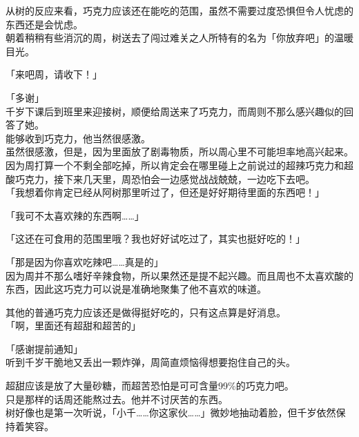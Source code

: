 从树的反应来看，巧克力应该还在能吃的范围，虽然不需要过度恐惧但令人忧虑的东西还是会忧虑。\\

朝着稍稍有些消沉的周，树送去了闯过难关之人所特有的名为「你放弃吧」的温暖目光。\\

\vspace{2\baselineskip}

「来吧周，请收下！」

「多谢」\\

千岁下课后到班里来迎接树，顺便给周送来了巧克力，而周则不那么感兴趣似的回答了她。\\

能够收到巧克力，他当然很感激。\\

虽然很感激，但是，因为里面放了剧毒物质，所以周心里不可能坦率地高兴起来。\\

因为周打算一个不剩全部吃掉，所以肯定会在哪里碰上之前说过的超辣巧克力和超酸巧克力，接下来几天里，周恐怕会一边感觉战战兢兢，一边吃下去吧。\\

「我想着你肯定已经从阿树那里听过了，但还是好好期待里面的东西吧！」

「我可不太喜欢辣的东西啊……」

「这还在可食用的范围里哦？我也好好试吃过了，其实也挺好吃的！」

「那是因为你喜欢吃辣吧……真是的」\\

因为周并不那么嗜好辛辣食物，所以果然还是提不起兴趣。而且周也不太喜欢酸的东西，因此这巧克力可以说是准确地聚集了他不喜欢的味道。

其他的普通巧克力应该还是做得挺好吃的，只有这点算是好消息。\\

「啊，里面还有超甜和超苦的」

「感谢提前通知」\\

听到千岁干脆地又丢出一颗炸弹，周简直烦恼得想要抱住自己的头。

超甜应该是放了大量砂糖，而超苦恐怕是可可含量99\%的巧克力吧。\\

只是那样的话周还能熬过去。他并不讨厌苦的东西。\\

树好像也是第一次听说，「小千……你这家伙……」微妙地抽动着脸，但千岁依然保持着笑容。\\

